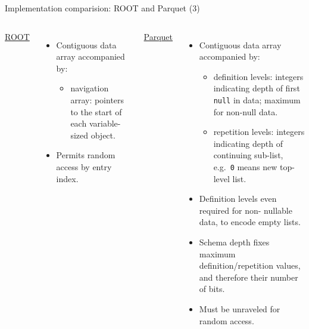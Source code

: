 \documentclass[aspectratio=169]{beamer}
\begin{document}
\begin{frame}{Implementation comparision: ROOT and Parquet (3)}
\vspace{0.5 cm}
\begin{columns}
{\large \underline{ROOT}}

\begin{itemize}
\item Contiguous data array accompanied by:

\begin{itemize}
\item navigation array: pointers to the start of each variable-sized object.
\end{itemize}

\item Permits random access by entry index.
\end{itemize}

{\large \underline{Parquet}}

\begin{itemize}
\item Contiguous data array accompanied by:
\begin{itemize}
\item definition levels: integers indicating depth of first {\tt\small null} in data; maximum for non-null data.
\item repetition levels: integers indicating depth of continuing sub-list, e.g.\ {\tt\small 0} means new top-level list.
\end{itemize}

\item Definition levels even required for non- nullable data, to encode empty lists.

\item Schema depth fixes maximum definition/repetition values, and therefore their number of bits.

\item Must be unraveled for random access.
\end{itemize}
\end{columns}
\end{frame}
\end{document}
